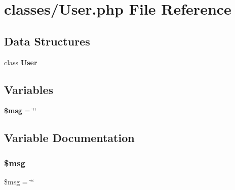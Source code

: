 \section{classes/\+User.php File Reference}
\label{_user_8php}
\subsection*{Data Structures}
\begin{DoxyCompactItemize}
\item 
class \textbf{ User}
\end{DoxyCompactItemize}
\subsection*{Variables}
\begin{DoxyCompactItemize}
\item 
\textbf{ \$msg} = \char`\"{}\char`\"{}
\end{DoxyCompactItemize}


\subsection{Variable Documentation}
\mbox{\label{_user_8php_a9e168f4152c267835864153c54449583}} 
\subsubsection{\$msg}
{\footnotesize\ttfamily \$msg = \char`\"{}\char`\"{}}


